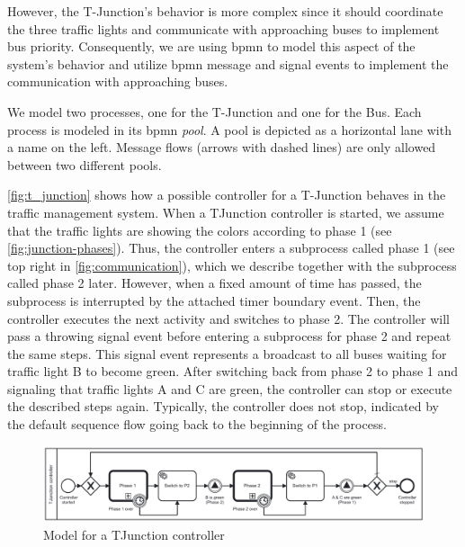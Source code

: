\documentclass{jot}
\begin{document}
However, the T-Junction's behavior is more complex since it should coordinate the three traffic lights and communicate with approaching buses to implement bus priority.
Consequently, we are using \gls*{bpmn} to model this aspect of the system's behavior and utilize \gls*{bpmn} message and signal events to implement the communication with approaching buses.

We model two processes, one for the T-Junction and one for the Bus.
Each process is modeled in its \gls*{bpmn} \textit{pool}.
A pool is depicted as a horizontal lane with a name on the left.
Message flows (arrows with dashed lines) are only allowed between two different pools.

\autoref{fig:t_junction} shows how a possible controller for a T-Junction behaves in the traffic management system.
When a TJunction controller is started, we assume that the traffic lights are showing the colors according to phase 1 (see \cref{fig:junction-phases}).
Thus, the controller enters a subprocess called phase 1 (see top right in \cref{fig:communication}), which we describe together with the subprocess called phase 2 later.
However, when a fixed amount of time has passed, the subprocess is interrupted by the attached timer boundary event.
Then, the controller executes the next activity and switches to phase 2.
The controller will pass a throwing signal event before entering a subprocess for phase 2 and repeat the same steps.
This signal event represents a broadcast to all buses waiting for traffic light B to become green.
After switching back from phase 2 to phase 1 and signaling that traffic lights A and C are green, the controller can stop or execute the described steps again.
Typically, the controller does not stop, indicated by the default sequence flow going back to the beginning of the process.

\begin{figure}[h]
    \centering
    \includegraphics[width=1\textwidth]{figures/t-junction.pdf}
    \caption{Model for a TJunction controller}
    \label{fig:t_junction}
\end{figure}
\end{document}
